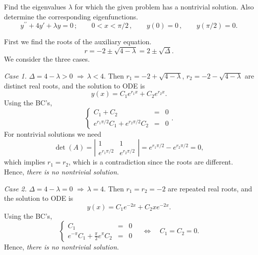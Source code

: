 \documentclass[11pt]{article}
\begin{document}
\begin{problem}
 Find the eigenvalues $\lambda$ for which the given problem has a nontrivial solution. Also determine the corresponding eigenfunctions.
\begin{equation*}
y^{\prime \prime} + 4 y' + \lambda y =0\,; \qquad  0<x<\pi/2 \,, \qquad y(0)=0  \,,\qquad y(\pi/2) =0. 
\end{equation*}
\end{problem}
\begin{solution}
First we find the roots of the auxiliary equation.
\[r=-2\pm\sqrt{4-\lambda}=2\pm\sqrt{\Delta}.\]
We consider the three cases.

\par \textsl{Case 1.} $\Delta = 4-\lambda >0 \,\, \Rightarrow \, \lambda<4.$ Then $r_{1}=-2+\sqrt{4-\lambda}$, $r_{2}=-2-\sqrt{4-\lambda}$ are distinct real roots, and the solution to ODE is
\[y(x)=C_{1}e^{r_{1}x}+C_{2}e^{r_{2}x}.\]
Using the BC's,
\begin{equation*}
\left\{\begin{array}{rcl}
       C_{1} +C_{2}&=&0\\
       e^{r_{1}\pi/2}C_{1} + e^{r_{2}\pi/2}C_{2}&=&0
      \end{array}\right. .
\end{equation*}
For nontrivial solutions we need 
$$\det(A)=\left|\begin{matrix} 1 & 1 \\ e^{r_{1}\pi/2} & e^{r_{2}\pi/2}\end{matrix}\right|=e^{r_{1}\pi/2}-e^{r_{2}\pi/2}=0,$$ 
which implies $r_{1}=r_{2}$, which is a contradiction since the roots are different. Hence, \textsl{there is no nontrivial solution}.

\par \textsl{Case 2.} $\Delta = 4-\lambda =0 \,\, \Rightarrow \, \lambda=4.$ Then $r_{1}=r_{2}=-2$ are repeated real roots, and the solution to ODE is
\[y(x)=C_{1}e^{-2x}+C_{2}xe^{-2x}.\]
Using the BC's,
\begin{equation*}
\left\{\begin{array}{rcl}
       C_{1}  &= &0\\
       e^{-\pi}C_{1} +\tfrac{\pi}{2}e^{\pi}C_{2} &= &0
      \end{array}\right. \quad \Leftrightarrow \quad C_{1}=C_{2}=0.
\end{equation*}
Hence, \textsl{there is no nontrivial solution}.


\end{solution}
\end{document}
